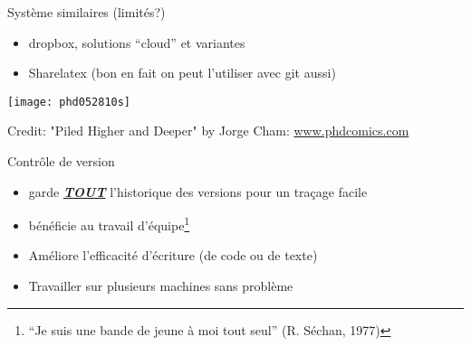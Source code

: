 \documentclass[unknownkeysallowed]{beamer}
\begin{document}
\begin{frame}{Système similaires (limités?)}

\begin{itemize}
  \item dropbox, solutions ``cloud'' et variantes

  \vspace{1.3cm}

  \item Sharelatex (bon en fait on peut l'utiliser avec git aussi)
\end{itemize}

\end{frame}




\begin{frame}{}
  \texttt{[image: phd052810s]}

{\small Credit: "Piled Higher and Deeper" by Jorge Cham: \url{www.phdcomics.com}
}
\end{frame}


\begin{frame}{Contrôle de version}

\begin{itemize}
  \item garde \underline{\emph{\textbf{TOUT}}} l'historique des versions pour un traçage facile

  \vspace{1.3cm}

  \item bénéficie au travail d'équipe\footnote{``Je suis une bande de jeune à moi tout seul'' (R. Séchan, 1977) }

  \vspace{1.3cm}

  \item Améliore l'efficacité d'écriture (de code ou de texte)

  \vspace{1.3cm}

  \item Travailler sur plusieurs machines sans problème


\end{itemize}
\end{frame}
\end{document}
